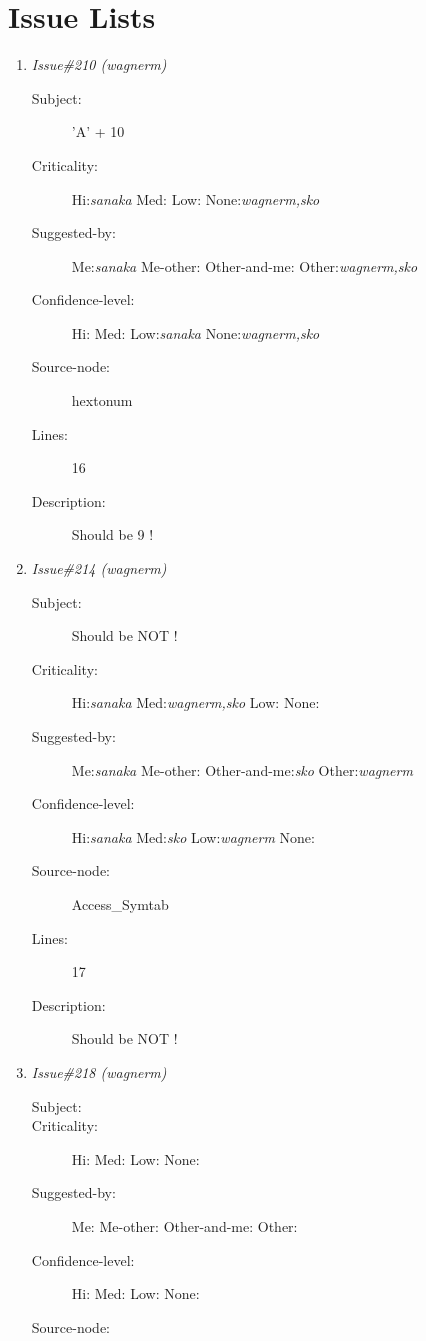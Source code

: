 \section{Issue Lists}
\begin{enumerate}
\item {\it Issue\#210 (wagnerm)}
\begin{description}
\item [Subject:] 'A' + 10
\item [Criticality:] Hi:{\it sanaka} Med:{\it } Low:{\it } None:{\it wagnerm,sko}
\item [Suggested-by:] Me:{\it sanaka} Me-other:{\it } Other-and-me:{\it } Other:{\it wagnerm,sko}
\item [Confidence-level:] Hi:{\it } Med:{\it } Low:{\it sanaka} None:{\it wagnerm,sko}
\item [Source-node:] hextonum

\item [Lines:] 16

\item [Description:] Should be 9 !
\end{description}
\item {\it Issue\#214 (wagnerm)}
\begin{description}
\item [Subject:] Should be NOT !
\item [Criticality:] Hi:{\it sanaka} Med:{\it wagnerm,sko} Low:{\it } None:{\it }
\item [Suggested-by:] Me:{\it sanaka} Me-other:{\it } Other-and-me:{\it sko} Other:{\it wagnerm}
\item [Confidence-level:] Hi:{\it sanaka} Med:{\it sko} Low:{\it wagnerm} None:{\it }
\item [Source-node:] Access\_Symtab

\item [Lines:] 17

\item [Description:] Should be NOT !
\end{description}
\item {\it Issue\#218 (wagnerm)}
\begin{description}
\item [Subject:] 
\item [Criticality:] Hi:{\it } Med:{\it } Low:{\it } None:{\it }
\item [Suggested-by:] Me:{\it } Me-other:{\it } Other-and-me:{\it } Other:{\it }
\item [Confidence-level:] Hi:{\it } Med:{\it } Low:{\it } None:{\it }
\item [Source-node:] 


\end{description}
\end{enumerate}

